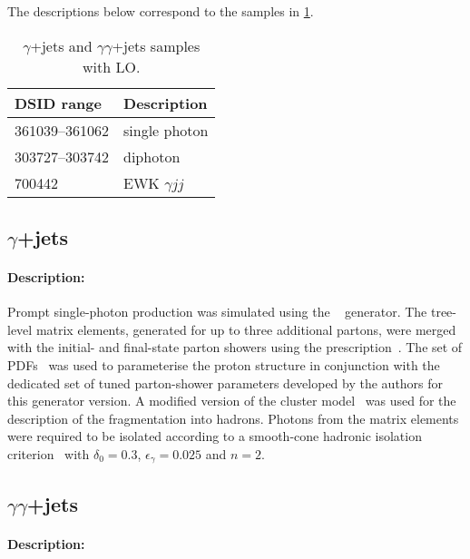 The descriptions below correspond to the samples in \cref{tab:gammajets-sherpa-lo}.

\begin{table}[!htbp]
  \caption{\(\gamma\)+jets and  \(\gamma\gamma\)+jets samples with \SHERPA LO\@.}%
  \label{tab:gammajets-sherpa-lo}
  \centering
  \begin{tabular}{l l}
    \toprule
    DSID range & Description \\
    \midrule
    361039--361062 & single photon \\
    303727--303742 & diphoton \\
    700442         & EWK \(\gamma jj\) \\
    \bottomrule
  \end{tabular}
\end{table}


\subsection[y+jets]{\(\gamma\)+jets}

\paragraph{Description:}

Prompt single-photon production was simulated using the \SHERPA[2.1]~\cite{Bothmann:2019yzt}
generator. The tree-level matrix elements, generated for up to three
additional partons, were merged with the initial- and final-state parton showers using the
\MEPSatLO prescription~\cite{Hoeche:2009rj}. The \CT[10nlo] set of PDFs~\cite{Lai:2010vv} was
used to parameterise the proton structure in conjunction with the dedicated set of tuned
parton-shower parameters developed by the \SHERPA authors for this generator version. A
modified version of the cluster model~\cite{Winter:2003tt} was used
for the description of the fragmentation into hadrons. Photons from the matrix elements were
required to be isolated according to a smooth-cone hadronic isolation criterion~\cite{Frixione:1998jh}
with \(\delta_0=0.3\), \(\epsilon_{\gamma}=0.025\) and \(n=2\).


\subsection[yy+jets]{ \(\gamma\gamma\)+jets}

\paragraph{Description:}

